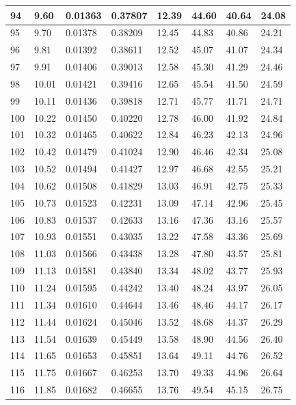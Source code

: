 \documentclass[12pt,a4paper,twoside]{article}
\begin{document}
\begin{center}
\begin{longtable}{l l l l | l l l l}
94 & 9.60 & 0.01363 & 0.37807 & 12.39 & 44.60 & 40.64 & 24.08 \\ \hline
95 & 9.70 & 0.01378 & 0.38209 & 12.45 & 44.83 & 40.86 & 24.21 \\ \hline
96 & 9.81 & 0.01392 & 0.38611 & 12.52 & 45.07 & 41.07 & 24.34 \\ \hline
97 & 9.91 & 0.01406 & 0.39013 & 12.58 & 45.30 & 41.29 & 24.46 \\ \hline
98 & 10.01 & 0.01421 & 0.39416 & 12.65 & 45.54 & 41.50 & 24.59 \\ \hline
99 & 10.11 & 0.01436 & 0.39818 & 12.71 & 45.77 & 41.71 & 24.71 \\ \hline
100 & 10.22 & 0.01450 & 0.40220 & 12.78 & 46.00 & 41.92 & 24.84 \\ \hline
101 & 10.32 & 0.01465 & 0.40622 & 12.84 & 46.23 & 42.13 & 24.96 \\ \hline
102 & 10.42 & 0.01479 & 0.41024 & 12.90 & 46.46 & 42.34 & 25.08 \\ \hline
103 & 10.52 & 0.01494 & 0.41427 & 12.97 & 46.68 & 42.55 & 25.21 \\ \hline
104 & 10.62 & 0.01508 & 0.41829 & 13.03 & 46.91 & 42.75 & 25.33 \\ \hline
105 & 10.73 & 0.01523 & 0.42231 & 13.09 & 47.14 & 42.96 & 25.45 \\ \hline
106 & 10.83 & 0.01537 & 0.42633 & 13.16 & 47.36 & 43.16 & 25.57 \\ \hline
107 & 10.93 & 0.01551 & 0.43035 & 13.22 & 47.58 & 43.36 & 25.69 \\ \hline
108 & 11.03 & 0.01566 & 0.43438 & 13.28 & 47.80 & 43.57 & 25.81 \\ \hline
109 & 11.13 & 0.01581 & 0.43840 & 13.34 & 48.02 & 43.77 & 25.93 \\ \hline
110 & 11.24 & 0.01595 & 0.44242 & 13.40 & 48.24 & 43.97 & 26.05 \\ \hline
111 & 11.34 & 0.01610 & 0.44644 & 13.46 & 48.46 & 44.17 & 26.17 \\ \hline
112 & 11.44 & 0.01624 & 0.45046 & 13.52 & 48.68 & 44.37 & 26.29 \\ \hline
113 & 11.54 & 0.01639 & 0.45449 & 13.58 & 48.90 & 44.56 & 26.40 \\ \hline
114 & 11.65 & 0.01653 & 0.45851 & 13.64 & 49.11 & 44.76 & 26.52 \\ \hline
115 & 11.75 & 0.01667 & 0.46253 & 13.70 & 49.33 & 44.96 & 26.64 \\ \hline
116 & 11.85 & 0.01682 & 0.46655 & 13.76 & 49.54 & 45.15 & 26.75 \\ \hline

\end{longtable}
\end{center}
\end{document}
